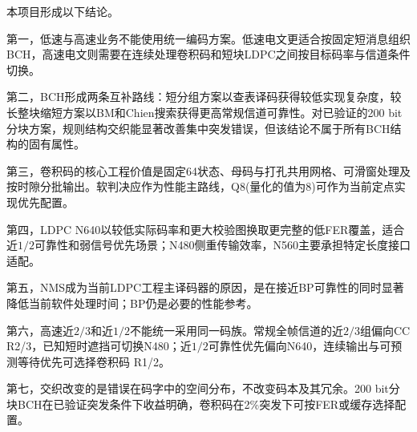 本项目形成以下结论。

第一，低速与高速业务不能使用统一编码方案。低速电文更适合按固定短消息组织BCH，高速电文则需要在连续处理卷积码和短块LDPC之间按目标码率与信道条件切换。

第二，BCH形成两条互补路线：短分组方案以查表译码获得较低实现复杂度，较长整块缩短方案以BM和Chien搜索获得更高常规信道可靠性。对已验证的200 bit分块方案，规则结构交织能显著改善集中突发错误，但该结论不属于所有BCH结构的固有属性。

第三，卷积码的核心工程价值是固定64状态、母码与打孔共用网格、可滑窗处理及按时隙分批输出。软判决应作为性能主路线，Q8(量化的值为8)可作为当前定点实现优先配置。

第四，LDPC N640以较低实际码率和更大校验图换取更完整的低FER覆盖，适合近$1/2$可靠性和弱信号优先场景；N480侧重传输效率，N560主要承担特定长度接口适配。

第五，NMS成为当前LDPC工程主译码器的原因，是在接近BP可靠性的同时显著降低当前软件处理时间；BP仍是必要的性能参考。

第六，高速近$2/3$和近$1/2$不能统一采用同一码族。常规全帧信道的近$2/3$组偏向CC R2/3，已知短时遮挡可切换N480；近$1/2$可靠性优先偏向N640，连续输出与可预测等待优先可选择卷积码 R1/2。

第七，交织改变的是错误在码字中的空间分布，不改变码本及其冗余。200 bit分块BCH在已验证突发条件下收益明确，卷积码在2\%突发下可按FER或缓存选择配置。
